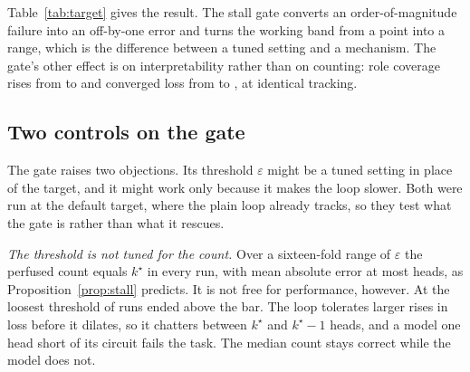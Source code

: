 \documentclass[11pt]{report}
\theoremstyle{plain}
\theoremstyle{definition}
\theoremstyle{remark}
\begin{document}
\begin{table}[h]
\centering\small

\caption{The target control. At the tight target the plain loop dilates through the early
transient and over-perfuses by an order of magnitude; the gate holds it to the correct
count. Mean absolute error at that target falls from $5.89$ to $0.50$ heads, a factor of
$11.8$. This is the prediction of Proposition~\ref{prop:stall}, tested after it was
derived.}
\label{tab:target}
\end{table}

Table~\ref{tab:target} gives the result. The stall gate converts an order-of-magnitude
failure into an off-by-one error and turns the working band from a point into a range,
which is the difference between a tuned setting and a mechanism. The gate's other effect
is on interpretability rather than on counting: role coverage rises from \numCovPlain{} to \numCovStall{}
and converged loss from \numLossPlain{} to \numLossStall{}, at identical tracking.

\subsection{Two controls on the gate}

The gate raises two objections. Its threshold $\varepsilon$ might be a tuned setting in
place of the target, and it might work only because it makes the loop slower. Both were
run at the default target, where the plain loop already tracks, so they test what the gate
is rather than what it rescues.

\begin{table}[h]
\centering\small

\caption{Controls on the stall gate, at the default target. ``Above bar'' counts runs
whose final loss exceeds $2\%$ of the trivial loss, the benchmark's solved threshold.}
\label{tab:controls}
\end{table}

\emph{The threshold is not tuned for the count.} Over a sixteen-fold range of
$\varepsilon$ the perfused count equals $k^\star$ in every run, with mean absolute error
at most \numEpsMaeMax{} heads, as Proposition~\ref{prop:stall} predicts. It is not free
for performance, however. At the loosest threshold \numEpsLooseBad{} of \numEpsLooseN{}
runs ended above the bar. The loop tolerates larger rises in loss before it dilates, so it
chatters between $k^\star$ and $k^\star - 1$ heads, and a model one head short of its
circuit fails the task. The median count stays correct while the model does not.
\end{document}
